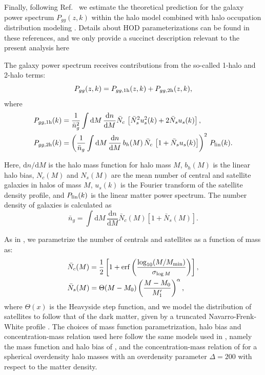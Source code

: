 \documentclass[a4paper,11pt]{article}
\begin{document}
    Finally, following Ref.~\cite{1912.08209} we estimate the theoretical prediction for the galaxy power spectrum $P_{gg}(z,k)$ within the halo model combined with halo occupation distribution modeling \cite{2000MNRAS.318.1144P,2002PhR...372....1C,2002ApJ...575..587B,2005ApJ...633..791Z,2013MNRAS.430..725V}. Details about HOD parameterizations can be found in these references, and we only provide a succinct description relevant to the present analysis here
    
    The galaxy power spectrum receives contributions from the so-called 1-halo and 2-halo terms:
    \begin{equation}
      P_{gg}(z,k) = P_{gg,{\rm 1h}}(z,k) + P_{gg,{\rm 2h}}(z,k),
    \end{equation}
    where
    \begin{align}
      & P_{gg,{\rm 1h}}(k)=\frac{1}{\bar{n}_g^2} \int \mathrm{d}M\,\frac{\mathrm{d}n}{\mathrm{d}M} \bar{N}_c\,\left[\bar{N}_s^2u_s^2(k)+2\bar{N}_su_s(k)\right],\\
      & P_{gg,{\rm 2h}}(k)=\left(\frac{1}{\bar{n}_g} \int \mathrm{d}M\,\frac{\mathrm{d}n}{\mathrm{d}M}\,b_h(M)\,\bar{N}_c\,\left[1+\bar{N}_su_s(k)\right]\right)^2\,P_{\rm lin}(k).
    \end{align}
    
    Here, $\mathrm{d}n/\mathrm{d}M$ is the halo mass function for halo mass $M$, $b_h(M)$ is the linear halo bias, $N_c(M)$ and $N_s(M)$ are the mean number of central and satellite galaxies in halos of mass $M$, $u_s(k)$ is the Fourier transform of the satellite density profile, and $P_{\rm lin}(k)$ is the linear matter power spectrum. The number density of galaxies is calculated as 
    \begin{equation}
      \bar{n}_g=\int \mathrm{d}M\,\frac{\mathrm{d}n}{\mathrm{d}M}\bar{N}_c(M)\left[1+\bar{N}_s(M)\right].
      \label{eq:ng_hod}
    \end{equation}    
    
    As in \cite{1912.08209}, we parametrize the number of centrals and satellites as a function of mass as:
    \begin{align}
      &\bar{N}_c(M)=\frac{1}{2}\left[1+{\rm erf}\left(\frac{\log_{10}(M/M_{\rm min})}{\sigma_{\log M}}\right)\right],\\
      &\bar{N}_s(M)=\Theta(M-M_0)\left(\frac{M-M_0}{M_1'}\right)^\alpha,
    \end{align}
    where $\Theta(x)$ is the Heavyside step function, and we model the distribution of satellites to follow that of the dark matter, given by a truncated Navarro-Frenk-White profile \cite{Navarro:1996}. The choices of mass function parametrization, halo bias and concentration-mass relation used here follow the same models used in \cite{1912.08209}, namely the mass function and halo bias of \cite{Tinker:2010}, and the concentration-mass relation of \cite{Duffy:2008} for a spherical overdensity halo masses with an overdensity parameter $\Delta=200$ with respect to the matter density.
 
\end{document}
